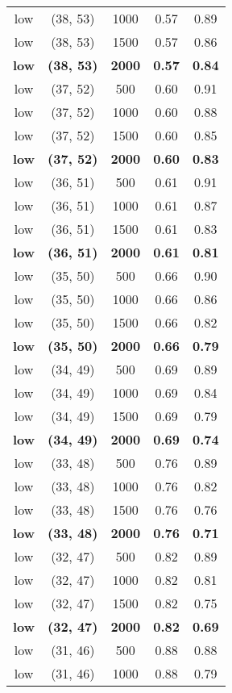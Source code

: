 \begin{tabular}{c c c c c}
low & (38, 53) &  1000 & 0.57 & 0.89 \\
low & (38, 53) &  1500 & 0.57 & 0.86 \\
\textbf{low} & \textbf{(38, 53)} & \textbf{ 2000} & \textbf{0.57} & \textbf{0.84} \\
low & (37, 52) &  500 & 0.60 & 0.91 \\
low & (37, 52) &  1000 & 0.60 & 0.88 \\
low & (37, 52) &  1500 & 0.60 & 0.85 \\
\textbf{low} & \textbf{(37, 52)} & \textbf{ 2000} & \textbf{0.60} & \textbf{0.83} \\
low & (36, 51) &  500 & 0.61 & 0.91 \\
low & (36, 51) &  1000 & 0.61 & 0.87 \\
low & (36, 51) &  1500 & 0.61 & 0.83 \\
\textbf{low} & \textbf{(36, 51)} & \textbf{ 2000} & \textbf{0.61} & \textbf{0.81} \\
low & (35, 50) &  500 & 0.66 & 0.90 \\
low & (35, 50) &  1000 & 0.66 & 0.86 \\
low & (35, 50) &  1500 & 0.66 & 0.82 \\
\textbf{low} & \textbf{(35, 50)} & \textbf{ 2000} & \textbf{0.66} & \textbf{0.79} \\
low & (34, 49) &  500 & 0.69 & 0.89 \\
low & (34, 49) &  1000 & 0.69 & 0.84 \\
low & (34, 49) &  1500 & 0.69 & 0.79 \\
\textbf{low} & \textbf{(34, 49)} & \textbf{ 2000} & \textbf{0.69} & \textbf{0.74} \\
low & (33, 48) &  500 & 0.76 & 0.89 \\
low & (33, 48) &  1000 & 0.76 & 0.82 \\
low & (33, 48) &  1500 & 0.76 & 0.76 \\
\textbf{low} & \textbf{(33, 48)} & \textbf{ 2000} & \textbf{0.76} & \textbf{0.71} \\
low & (32, 47) &  500 & 0.82 & 0.89 \\
low & (32, 47) &  1000 & 0.82 & 0.81 \\
low & (32, 47) &  1500 & 0.82 & 0.75 \\
\textbf{low} & \textbf{(32, 47)} & \textbf{ 2000} & \textbf{0.82} & \textbf{0.69} \\
low & (31, 46) &  500 & 0.88 & 0.88 \\
low & (31, 46) &  1000 & 0.88 & 0.79 \\

\end{tabular}
